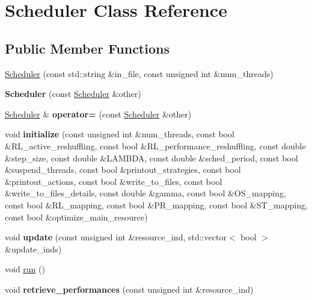 \hypertarget{classScheduler}{\section{Scheduler Class Reference}
\label{classScheduler}
}
\subsection*{Public Member Functions}
\begin{DoxyCompactItemize}
\item 
\hyperlink{classScheduler_a9d9fdac53788885928fa849892250819}{Scheduler} (const std\-::string \&in\-\_\-file, const unsigned int \&num\-\_\-threads)
\item 
\hypertarget{classScheduler_aa55196b20c6a062b2f479776738622fd}{{\bfseries Scheduler} (const \hyperlink{classScheduler}{Scheduler} \&other)}\label{classScheduler_aa55196b20c6a062b2f479776738622fd}

\item 
\hypertarget{classScheduler_a8a41677eaa1266ec0ab41dcf0ac0d865}{\hyperlink{classScheduler}{Scheduler} \& {\bfseries operator=} (const \hyperlink{classScheduler}{Scheduler} \&other)}\label{classScheduler_a8a41677eaa1266ec0ab41dcf0ac0d865}

\item 
\hypertarget{classScheduler_a27e2a247cde3ad80ac25b9188a1e17ee}{void {\bfseries initialize} (const unsigned int \&num\-\_\-threads, const bool \&R\-L\-\_\-active\-\_\-reshuffling, const bool \&R\-L\-\_\-performance\-\_\-reshuffling, const double \&step\-\_\-size, const double \&L\-A\-M\-B\-D\-A, const double \&sched\-\_\-period, const bool \&suspend\-\_\-threads, const bool \&printout\-\_\-strategies, const bool \&printout\-\_\-actions, const bool \&write\-\_\-to\-\_\-files, const bool \&write\-\_\-to\-\_\-files\-\_\-details, const double \&gamma, const bool \&O\-S\-\_\-mapping, const bool \&R\-L\-\_\-mapping, const bool \&P\-R\-\_\-mapping, const bool \&S\-T\-\_\-mapping, const bool \&optimize\-\_\-main\-\_\-resource)}\label{classScheduler_a27e2a247cde3ad80ac25b9188a1e17ee}

\item 
\hypertarget{classScheduler_ac0f68dd6a14fdf70dc964c67dc8d39b2}{void {\bfseries update} (const unsigned int \&resource\-\_\-ind, std\-::vector$<$ bool $>$ \&update\-\_\-inds)}\label{classScheduler_ac0f68dd6a14fdf70dc964c67dc8d39b2}

\item 
void \hyperlink{classScheduler_a58fba108ce2748870a6288cd6f5fd1e3}{run} ()
\item 
\hypertarget{classScheduler_ad187198f24a2b283a4628f0e0b3ffd84}{void {\bfseries retrieve\-\_\-performances} (const unsigned int \&resource\-\_\-ind)}\label{classScheduler_ad187198f24a2b283a4628f0e0b3ffd84}


\end{DoxyCompactItemize}
